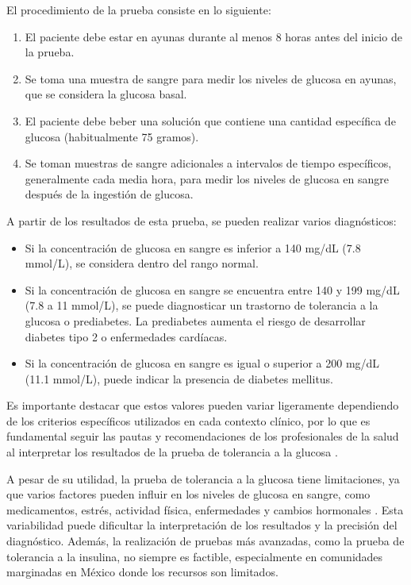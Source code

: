 El procedimiento de la prueba consiste en lo siguiente:

\begin{enumerate}
    \item El paciente debe estar en ayunas durante al menos 8 horas antes del inicio de la prueba.
    \item Se toma una muestra de sangre para medir los niveles de glucosa en ayunas, que se considera la glucosa basal.
    \item El paciente debe beber una solución que contiene una cantidad específica de glucosa (habitualmente 75 gramos).
    \item Se toman muestras de sangre adicionales a intervalos de tiempo específicos, generalmente cada media hora, para medir los niveles de glucosa en sangre después de la ingestión de glucosa.
\end{enumerate}
 
A partir de los resultados de esta prueba, se pueden realizar varios diagnósticos:

\begin{itemize}
    \item Si la concentración de glucosa en sangre es inferior a 140 mg/dL (7.8 mmol/L), se considera dentro del rango normal.
    
    \item Si la concentración de glucosa en sangre se encuentra entre 140 y 199 mg/dL (7.8 a 11 mmol/L), se puede diagnosticar un trastorno de tolerancia a la glucosa o prediabetes. La prediabetes aumenta el riesgo de desarrollar diabetes tipo 2 o enfermedades cardíacas.
    
    \item Si la concentración de glucosa en sangre es igual o superior a 200 mg/dL (11.1 mmol/L), puede indicar la presencia de diabetes mellitus.
\end{itemize}

Es importante destacar que estos valores pueden variar ligeramente dependiendo de los criterios específicos utilizados en cada contexto clínico, por lo que es fundamental seguir las pautas y recomendaciones de los profesionales de la salud al interpretar los resultados de la prueba de tolerancia a la glucosa \cite{testGlu}.

A pesar de su utilidad, la prueba de tolerancia a la glucosa tiene limitaciones, ya que varios factores pueden influir en los niveles de glucosa en sangre, como medicamentos, estrés, actividad física, enfermedades y cambios hormonales \cite{causasGlu}. Esta variabilidad puede dificultar la interpretación de los resultados y la precisión del diagnóstico. Además, la realización de pruebas más avanzadas, como la prueba de tolerancia a la insulina, no siempre es factible, especialmente en comunidades marginadas en México donde los recursos son limitados.

